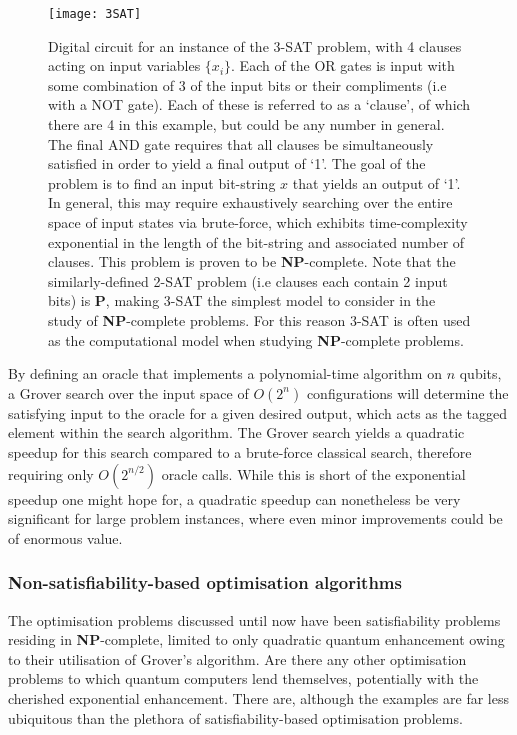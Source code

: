 \begin{figure}[!htb]
\texttt{[image: 3SAT]}
\caption{Digital circuit for an instance of the 3-\textsc{SAT} problem, with 4 clauses acting on input variables $\{x_i\}$. Each of the OR gates is input with some combination of 3 of the input bits or their compliments (i.e with a NOT gate). Each of these is referred to as a `clause', of which there are 4 in this example, but could be any number in general. The final AND gate requires that all clauses be simultaneously satisfied in order to yield a final output of `1'. The goal of the problem is to find an input bit-string $x$ that yields an output of `1'. In general, this may require exhaustively searching over the entire space of input states via brute-force, which exhibits time-complexity exponential in the length of the bit-string and associated number of clauses. This problem is proven to be \textbf{NP}-complete. Note that the similarly-defined 2-\textsc{SAT} problem (i.e clauses each contain 2 input bits) is \textbf{P}, making 3-\textsc{SAT} the simplest model to consider in the study of \textbf{NP}-complete problems. For this reason 3-\textsc{SAT} is often used as the computational model when studying \textbf{NP}-complete problems.} \label{fig:3SAT}	
\end{figure}

By defining an oracle that implements a polynomial-time algorithm on $n$ qubits, a Grover search over the input space of $O(2^n)$ configurations will determine the satisfying input to the oracle for a given desired output, which acts as the tagged element within the search algorithm. The Grover search yields a quadratic speedup for this search compared to a brute-force classical search, therefore requiring only $O(2^{n/2})$ oracle calls. While this is short of the exponential speedup one might hope for, a quadratic speedup can nonetheless be very significant for large problem instances, where even minor improvements could be of enormous value.

\subsubsection{Non-satisfiability-based optimisation algorithms}

The optimisation problems discussed until now have been satisfiability problems residing in \textbf{NP}-complete, limited to only quadratic quantum enhancement owing to their utilisation of Grover's algorithm. Are there any other optimisation problems to which quantum computers lend themselves, potentially with the cherished exponential enhancement. There are, although the examples are far less ubiquitous than the plethora of satisfiability-based optimisation problems.

